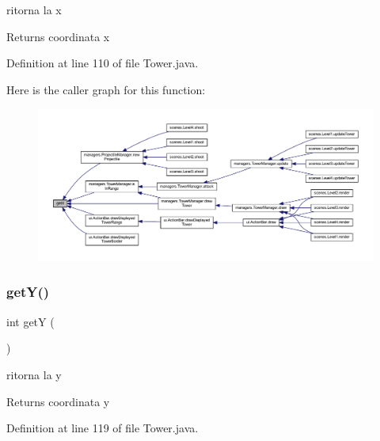 ritorna la x 

\begin{DoxyReturn}{Returns}
coordinata x 
\end{DoxyReturn}


Definition at line 110 of file Tower.\+java.

Here is the caller graph for this function\+:\nopagebreak
\begin{figure}[H]
\begin{center}
\leavevmode
\includegraphics[width=350pt]{classtowers_1_1_tower_ae13f88e922e1339355456062ad9fa359_icgraph}
\end{center}
\end{figure}
\mbox{\label{classtowers_1_1_tower_aab81944f0a14bba932c0931899951937}} 
\subsubsection{\texorpdfstring{get\+Y()}{getY()}}
{\footnotesize\ttfamily int getY (\begin{DoxyParamCaption}{ }\end{DoxyParamCaption})}



ritorna la y 

\begin{DoxyReturn}{Returns}
coordinata y 
\end{DoxyReturn}


Definition at line 119 of file Tower.\+java.

